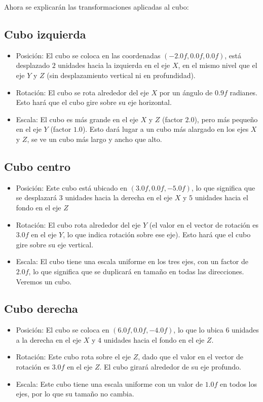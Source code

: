 \documentclass[a4paper,11pt]{article}                 %
\begin{document}
Ahora se explicarán las transformaciones aplicadas al cubo:
\subsection{Cubo izquierda}
\begin{itemize}
    \item Posición: El cubo se coloca en las coordenadas $(-2.0f, 0.0f, 0.0f)$, está desplazado $2$ unidades hacia la izquierda en el eje $X$, en el mismo nivel que el eje $Y$ y $Z$ (sin desplazamiento vertical ni en profundidad).  
    \item Rotación: El cubo se rota alrededor del eje $X$ por un ángulo de $0.9f$ radianes. Esto hará que el cubo gire sobre su eje horizontal. 
    \item Escala: El cubo es más grande en el eje $X$ y $Z$ (factor $2.0$), pero más pequeño en el eje $Y$ (factor $1.0$). Esto dará lugar a un cubo más alargado en los ejes $X$ y $Z$, se ve un cubo más largo y ancho que alto. 
\end{itemize}
\subsection{Cubo centro}
\begin{itemize}
    \item Posición: Este cubo está ubicado en $(3.0f, 0.0f, -5.0f)$, lo que significa que se desplazará $3$ unidades hacia la derecha en el eje $X$ y $5$ unidades hacia el fondo en el eje $Z$
    \item Rotación: El cubo rota alrededor del eje $Y$ (el valor en el vector de rotación es $3.0f$ en el eje $Y$, lo que indica rotación sobre ese eje). Esto hará que el cubo gire sobre su eje vertical.
    \item Escala: El cubo tiene una escala uniforme en los tres ejes, con un factor de $2.0f$, lo que significa que se duplicará en tamaño en todas las direcciones. Veremos un cubo.
\end{itemize}
\subsection{Cubo derecha}
\begin{itemize}
    \item Posición: El cubo se coloca en $(6.0f, 0.0f, -4.0f)$, lo que lo ubica $6$ unidades a la derecha en el eje $X$ y $4$ unidades hacia el fondo en el eje $Z$.
    \item Rotación: Este cubo rota sobre el eje $Z$, dado que el valor en el vector de rotación es $3.0f$ en el eje $Z$. El cubo girará alrededor de su eje profundo.
    \item Escala: Este cubo tiene una escala uniforme con un valor de $1.0f$ en todos los ejes, por lo que su tamaño no cambia. 
\end{itemize}
\end{document}
